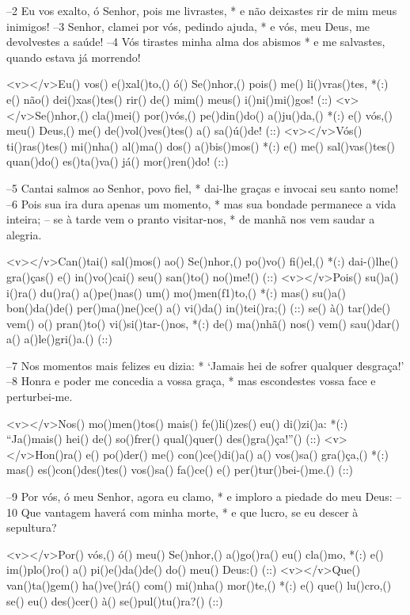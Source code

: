 –2 Eu vos exalto, ó Senhor, pois me livrastes, *
e não deixastes rir de mim meus inimigos!
–3 Senhor, clamei por vós, pedindo ajuda, *
e vós, meu Deus, me devolvestes a saúde!
–4 Vós tirastes minha alma dos abismos *
e me salvastes, quando estava já morrendo!

<v></v>Eu() vos() e()xal()to,() ó() Se()nhor,() pois() me() li()vras()tes, *(:)
e() não() dei()xas()tes() rir() de() mim() meus() i()ni()mi()gos! (::)
<v></v>Se()nhor,() cla()mei() por()vós,() pe()din()do() a()ju()da,() *(:)
e() vós,() meu() Deus,() me() de()vol()ves()tes() a() sa()ú()de! (::)
<v></v>Vós() ti()ras()tes() mi()nha() al()ma() dos() a()bis()mos() *(:)
e() me() sal()vas()tes() quan()do() es()ta()va() já() mor()ren()do! (::)

–5 Cantai salmos ao Senhor, povo fiel, *
dai-lhe graças e invocai seu santo nome!
–6 Pois sua ira dura apenas um momento, *
mas sua bondade permanece a vida inteira;
– se à tarde vem o pranto visitar-nos, *
de manhã nos vem saudar a alegria.

<v></v>Can()tai() sal()mos() ao() Se()nhor,() po()vo() fi()el,() *(:)
dai-()lhe() gra()ças() e() in()vo()cai() seu() san()to() no()me!() (::)
<v></v>Pois() su()a() i()ra() du()ra() a()pe()nas() um() mo()men(f1)to,() *(:)
mas() su()a() bon()da()de() per()ma()ne()ce() a() vi()da() in()tei()ra;() (::)
se() à() tar()de() vem() o() pran()to() vi()si()tar-()nos, *(:)
de() ma()nhã() nos() vem() sau()dar() a() a()le()gri()a.() (::)

–7 Nos momentos mais felizes eu dizia: *
‘Jamais hei de sofrer qualquer desgraça!’
–8 Honra e poder me concedia a vossa graça, *
mas escondestes vossa face e perturbei-me.

<v></v>Nos() mo()men()tos() mais() fe()li()zes() eu() di()zi()a: *(:)
``Ja()mais() hei() de() so()frer() qual()quer() des()gra()ça!''() (::)
<v></v>Hon()ra() e() po()der() me() con()ce()di()a() a() vos()sa() gra()ça,() *(:)
mas() es()con()des()tes() vos()sa() fa()ce() e() per()tur()bei-()me.() (::)

–9 Por vós, ó meu Senhor, agora eu clamo, *
e imploro a piedade do meu Deus:
–10 Que vantagem haverá com minha morte, *
e que lucro, se eu descer à sepultura?

<v></v>Por() vós,() ó() meu() Se()nhor,() a()go()ra() eu() cla()mo, *(:)
e() im()plo()ro() a() pi()e()da()de() do() meu() Deus:() (::)
<v></v>Que() van()ta()gem() ha()ve()rá() com() mi()nha() mor()te,() *(:)
e() que() lu()cro,() se() eu() des()cer() à() se()pul()tu()ra?() (::)

